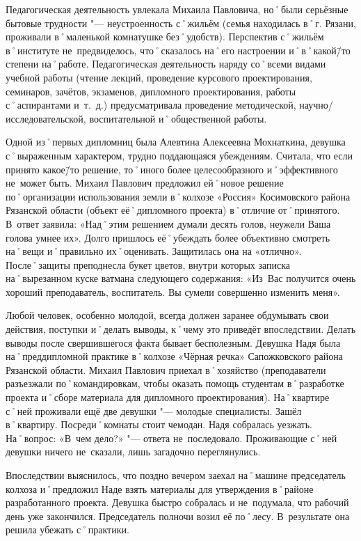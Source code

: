 Педагогическая деятельность увлекала Михаила Павловича, но˚были серьёзные бытовые трудности "--- неустроенность с˚жильём (семья находилась в˚г. Рязани, проживали в˚маленькой комнатушке без˚удобств). Перспектив с˚жильём в˚институте не~предвиделось, что˚сказалось на˚его настроении и˚в˚какой\=/то степени на˚работе.
Педагогическая деятельность наряду со˚всеми видами учебной работы (чтение лекций, проведение курсового проектирования, семинаров, зачётов, экзаменов, дипломного проектирования, работы с˚аспирантами и~т.~д.) предусматривала проведение методической, научно\-/исследовательской, воспитательной и˚общественной работы.

Одной из˚первых дипломниц была Алевтина Алексеевна Мохнаткина, девушка с˚выраженным характером, трудно поддающаяся убеждениям. Считала, что если принято какое\=/то решение, то˚иного более целесообразного и˚эффективного не~может быть. Михаил Павлович предложил ей˚новое решение по˚организации использования земли в˚колхозе «Россия» Косимовского района Рязанской области (объект её˚дипломного проекта) в˚отличие от˚принятого. В~ответ заявила: «Над˚этим решением думали десять голов, неужели Ваша голова умнее их». Долго пришлось её˚убеждать более объективно смотреть на˚вещи и˚правильно их˚оценивать. Защитилась она на «отлично». После˚защиты преподнесла букет цветов, внутри которых записка на˚вырезанном куске ватмана следующего содержания: «Из~Вас получится очень хороший преподаватель, воспитатель. Вы сумели совершенно изменить меня».

Любой человек, особенно молодой, всегда должен заранее обдумывать свои действия, поступки и˚делать выводы, к˚чему это приведёт впоследствии. Делать выводы после свершившегося факта бывает бесполезным. Девушка Надя была на˚преддипломной практике в˚колхозе «Чёрная речка» Сапожковского района Рязанской области. Михаил Павлович приехал в˚хозяйство (преподаватели разъезжали по˚командировкам, чтобы оказать помощь студентам в˚разработке проекта и˚сборе материала для дипломного проектирования). На˚квартире с˚ней проживали ещё две девушки "--- молодые специалисты. Зашёл в˚квартиру. Посреди˚комнаты стоит чемодан. Надя собралась уезжать. На˚вопрос: «В~чем дело?» "--- ответа не~последовало. Проживающие с˚ней девушки ничего не~сказали, лишь загадочно переглянулись. 

Впоследствии выяснилось, что поздно вечером заехал на˚машине председатель колхоза и˚предложил Наде взять материалы для утверждения в˚районе разработанного проекта. Девушка быстро собралась и не~подумала, что рабочий день уже закончился. Председатель полночи возил её по˚лесу. В~результате она решила убежать с˚практики. 

